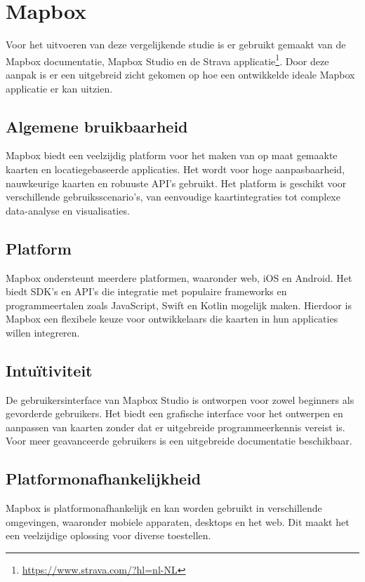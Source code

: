 \section{Mapbox}
\label{sec:mapbox}

Voor het uitvoeren van deze vergelijkende studie is er gebruikt gemaakt van de Mapbox documentatie, Mapbox Studio en de Strava applicatie\footnote{\url{https://www.strava.com/?hl=nl-NL}}. Door deze aanpak is er een uitgebreid zicht gekomen op hoe een ontwikkelde ideale Mapbox applicatie er kan uitzien.

\subsection*{Algemene bruikbaarheid}
Mapbox biedt een veelzijdig platform voor het maken van op maat gemaakte kaarten en locatiegebaseerde applicaties. Het wordt voor hoge aanpasbaarheid, nauwkeurige kaarten en robuuste API's gebruikt. Het platform is geschikt voor verschillende gebruiksscenario's, van eenvoudige kaartintegraties tot complexe data-analyse en visualisaties.

\subsection*{Platform}
Mapbox ondersteunt meerdere platformen, waaronder web, iOS en Android. Het biedt SDK's en API's die integratie met populaire frameworks en programmeertalen zoals JavaScript, Swift en Kotlin mogelijk maken. Hierdoor is Mapbox een flexibele keuze voor ontwikkelaars die kaarten in hun applicaties willen integreren.

\subsection*{Intuïtiviteit}
De gebruikersinterface van Mapbox Studio is ontworpen voor zowel beginners als gevorderde gebruikers. Het biedt een grafische interface voor het ontwerpen en aanpassen van kaarten zonder dat er uitgebreide programmeerkennis vereist is. Voor meer geavanceerde gebruikers is een uitgebreide documentatie beschikbaar.

\subsection*{Platformonafhankelijkheid}
Mapbox is platformonafhankelijk en kan worden gebruikt in verschillende omgevingen, waaronder mobiele apparaten, desktops en het web. Dit maakt het een veelzijdige oplossing voor diverse toestellen.


